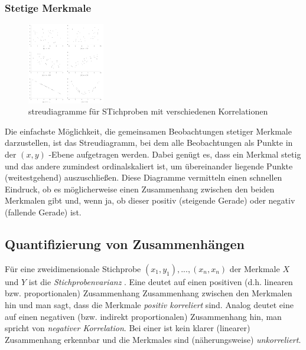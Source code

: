 \subsubsection{Stetige Merkmale}
\begin{figure}
    \vspace{-8mm}
    \centering
    \includegraphics[width=0.3\textwidth]{images/3.4_streudiagramme_mit_unterschiedlicher_kor.png}
    \caption{streudiagramme für STichproben mit verschiedenen Korrelationen}
    \vspace{-3mm}
    \label{fig:streudiagramme}
\end{figure}
Die einfachste Möglichkeit, die gemeinsamen Beobachtungen stetiger Merkmale darzustellen, ist das Streudiagramm, bei dem alle Beobachtungen als Punkte in der $(x, y)$ -Ebene aufgetragen werden. Dabei genügt es, dass ein Merkmal stetig und das andere zumindest ordinalskaliert ist, um übereinander liegende Punkte (weitestgehend) auszuschließen. Diese Diagramme vermitteln einen schnellen Eindruck, ob es möglicherweise einen Zusammenhang zwischen den beiden Merkmalen gibt und, wenn ja, ob dieser positiv (steigende Gerade) oder negativ (fallende Gerade) ist.

\subsection{Quantifizierung von Zusammenhängen}
Für eine zweidimensionale Stichprobe $(x_1, y_1), ..., (x_n, x_n)$ der Merkmale $X$ und $Y$ ist die \emph{Stichprobenvarianz} . Eine  deutet auf einen positiven (d.h. linearen bzw. proportionalen) Zusammenhang Zusammenhang zwischen den Merkmalen hin und man sagt, dass die Merkmale \emph{positiv korreliert} sind. Analog deutet eine  auf einen negativen (bzw. indirekt proportionalen) Zusammenhang hin, man spricht von \emph{negativer Korrelation}. Bei einer  ist kein klarer (linearer) Zusammenhang erkennbar und die Merkmales sind (näherungsweise) \emph{unkorreliert}.\\\\

